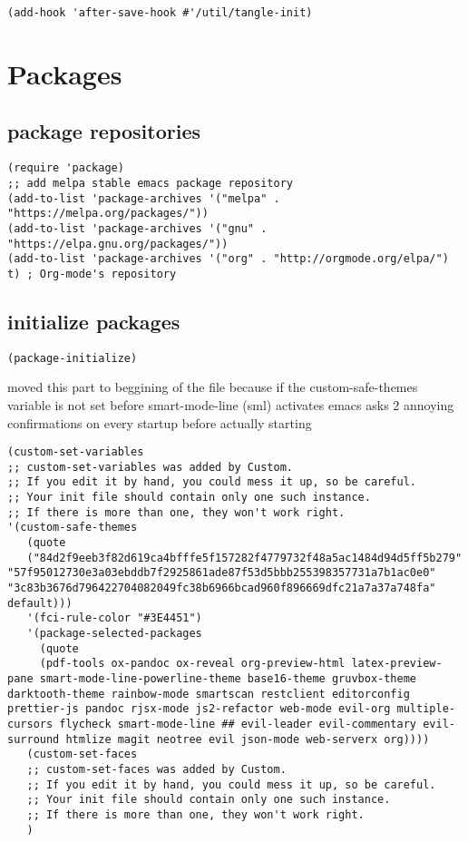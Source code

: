 \documentclass[11pt]{article}
\begin{document}
\begin{verbatim}
(add-hook 'after-save-hook #'/util/tangle-init)
\end{verbatim}

\section*{Packages}
\label{sec:orge690e3a}

\subsection*{package repositories}
\label{sec:orge7d3de9}

\begin{verbatim}
(require 'package)
;; add melpa stable emacs package repository
(add-to-list 'package-archives '("melpa" . "https://melpa.org/packages/"))
(add-to-list 'package-archives '("gnu" . "https://elpa.gnu.org/packages/"))
(add-to-list 'package-archives '("org" . "http://orgmode.org/elpa/") t) ; Org-mode's repository
\end{verbatim}

\subsection*{initialize packages}
\label{sec:org88cb0f3}
\begin{verbatim}
(package-initialize)
\end{verbatim}

moved this part to beggining of the file because if the
custom-safe-themes variable is not set before smart-mode-line (sml) activates
emacs asks 2 annoying confirmations on every startup before actually starting

\begin{verbatim}
(custom-set-variables
;; custom-set-variables was added by Custom.
;; If you edit it by hand, you could mess it up, so be careful.
;; Your init file should contain only one such instance.
;; If there is more than one, they won't work right.
'(custom-safe-themes
   (quote
   ("84d2f9eeb3f82d619ca4bfffe5f157282f4779732f48a5ac1484d94d5ff5b279" "57f95012730e3a03ebddb7f2925861ade87f53d5bbb255398357731a7b1ac0e0" "3c83b3676d796422704082049fc38b6966bcad960f896669dfc21a7a37a748fa" default)))
   '(fci-rule-color "#3E4451")
   '(package-selected-packages
     (quote
     (pdf-tools ox-pandoc ox-reveal org-preview-html latex-preview-pane smart-mode-line-powerline-theme base16-theme gruvbox-theme darktooth-theme rainbow-mode smartscan restclient editorconfig prettier-js pandoc rjsx-mode js2-refactor web-mode evil-org multiple-cursors flycheck smart-mode-line ## evil-leader evil-commentary evil-surround htmlize magit neotree evil json-mode web-serverx org))))
   (custom-set-faces
   ;; custom-set-faces was added by Custom.
   ;; If you edit it by hand, you could mess it up, so be careful.
   ;; Your init file should contain only one such instance.
   ;; If there is more than one, they won't work right.
   )
\end{verbatim}
\end{document}
